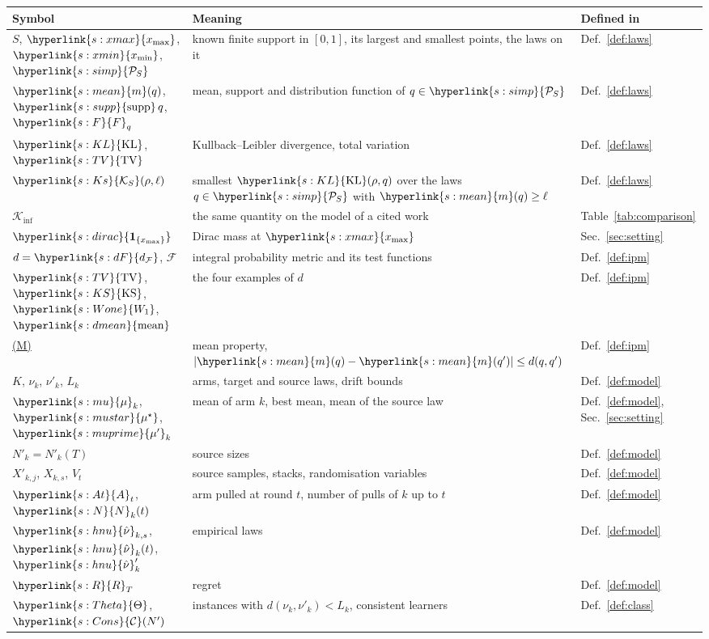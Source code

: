 \documentclass[11pt]{article}
\newcommand{\Kinf}{\mathcal{K}_{\inf}}
\newcommand{\sy}[2]{{\hyperlink{#1}{#2}}}
\newcommand{\term}[2]{\hyperlink{#1}{#2}}
\newcommand{\xmax}{\sy{s:xmax}{x_{\max}}}
\newcommand{\xmin}{\sy{s:xmin}{x_{\min}}}
\newcommand{\Simp}{\sy{s:simp}{\mathcal{P}_{S}}}
\newcommand{\mean}{\sy{s:mean}{m}}
\newcommand{\supp}{\sy{s:supp}{\mathrm{supp}}}
\newcommand{\Fd}{\sy{s:F}{F}}
\newcommand{\KL}{\sy{s:KL}{\mathrm{KL}}}
\newcommand{\TV}{\sy{s:TV}{\mathrm{TV}}}
\newcommand{\Ks}{\sy{s:Ks}{\mathcal{K}_{S}}}
\newcommand{\dirac}{\sy{s:dirac}{\mathbf{1}_{\{x_{\max}\}}}}
\newcommand{\dF}{\sy{s:dF}{d_{\mathcal F}}}
\newcommand{\KSd}{\sy{s:KS}{\mathrm{KS}}}
\newcommand{\Wone}{\sy{s:Wone}{W_{1}}}
\newcommand{\dmean}{\sy{s:dmean}{\mathrm{mean}}}
\newcommand{\propM}{\term{s:M}{(M)}}
\newcommand{\mk}{\sy{s:mu}{\mu}}
\newcommand{\mus}{\sy{s:mustar}{\mu^{\star}}}
\newcommand{\mkp}{\sy{s:muprime}{\mu'}}
\newcommand{\At}{\sy{s:At}{A}}
\newcommand{\Nc}{\sy{s:N}{N}}
\newcommand{\hnu}{\sy{s:hnu}{\hat\nu}}
\newcommand{\Reg}{\sy{s:R}{R}}
\newcommand{\Thet}{\sy{s:Theta}{\Theta}}
\newcommand{\Cons}{\sy{s:Cons}{\mathcal{C}}}
\begin{document}
\begin{center}
\small
\begin{tabular}{@{}p{}p{}p{}@{}}
\toprule
\raggedright Symbol & \raggedright Meaning & \raggedright Defined in\tabularnewline
\midrule
\raggedright $S$, $\xmax$, $\xmin$, $\Simp$ & \raggedright known finite support in $[0,1]$, its largest and smallest points, the laws on it & \raggedright Def.~\ref{def:laws}\tabularnewline
\raggedright $\mean(q)$, $\supp\,q$, $\Fd_q$ & \raggedright mean, support and distribution function of $q\in\Simp$ & \raggedright Def.~\ref{def:laws}\tabularnewline
\raggedright $\KL$, $\TV$ & \raggedright Kullback--Leibler divergence, total variation & \raggedright Def.~\ref{def:laws}\tabularnewline
\raggedright $\Ks(\rho,\ell)$ & \raggedright smallest $\KL(\rho,q)$ over the laws $q\in\Simp$ with $\mean(q)\ge\ell$ & \raggedright Def.~\ref{def:laws}\tabularnewline
\raggedright $\Kinf$ & \raggedright the same quantity on the model of a cited work & \raggedright Table~\ref{tab:comparison}\tabularnewline
\raggedright $\dirac$ & \raggedright Dirac mass at $\xmax$ & \raggedright Sec.~\ref{sec:setting}\tabularnewline
\raggedright $d=\dF$, $\mathcal F$ & \raggedright integral probability metric and its test functions & \raggedright Def.~\ref{def:ipm}\tabularnewline
\raggedright $\TV$, $\KSd$, $\Wone$, $\dmean$ & \raggedright the four examples of $d$ & \raggedright Def.~\ref{def:ipm}\tabularnewline
\raggedright \propM{} & \raggedright mean property, $|\mean(q)-\mean(q')|\le d(q,q')$ & \raggedright Def.~\ref{def:ipm}\tabularnewline
\raggedright $K$, $\nu_k$, $\nu'_k$, $L_k$ & \raggedright arms, target and source laws, drift bounds & \raggedright Def.~\ref{def:model}\tabularnewline
\raggedright $\mk_k$, $\mus$, $\mkp_k$ & \raggedright mean of arm $k$, best mean, mean of the source law & \raggedright Def.~\ref{def:model}, Sec.~\ref{sec:setting}\tabularnewline
\raggedright $N'_k=N'_k(T)$ & \raggedright source sizes & \raggedright Def.~\ref{def:model}\tabularnewline
\raggedright $X'_{k,j}$, $X_{k,s}$, $V_t$ & \raggedright source samples, stacks, randomisation variables & \raggedright Def.~\ref{def:model}\tabularnewline
\raggedright $\At_t$, $\Nc_k(t)$ & \raggedright arm pulled at round $t$, number of pulls of $k$ up to $t$ & \raggedright Def.~\ref{def:model}\tabularnewline
\raggedright $\hnu_{k,s}$, $\hnu_k(t)$, $\hnu'_k$ & \raggedright empirical laws & \raggedright Def.~\ref{def:model}\tabularnewline
\raggedright $\Reg_T$ & \raggedright regret & \raggedright Def.~\ref{def:model}\tabularnewline
\raggedright $\Thet$, $\Cons(N')$ & \raggedright instances with $d(\nu_k,\nu'_k)<L_k$, consistent learners & \raggedright Def.~\ref{def:class}\tabularnewline

\end{tabular}
\end{center}
\end{document}
